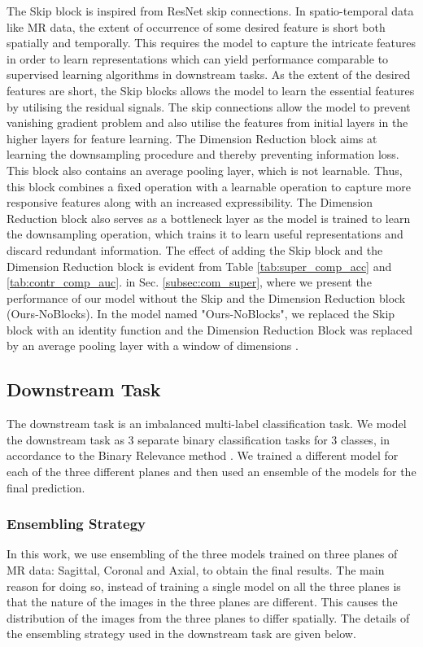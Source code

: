 \documentclass[journal]{IEEEtai}
\begin{document}
\indent The Skip block is inspired from ResNet \cite{resnet} skip connections. In spatio-temporal data like MR data, the extent of occurrence of some desired feature is short both spatially and temporally. This requires the model to capture the intricate features in order to learn representations which can yield performance comparable to supervised learning algorithms in downstream tasks. As the extent of the desired features are short, the Skip blocks allows the model to learn the essential features by utilising the residual signals. The skip connections allow the model to prevent vanishing gradient problem and also utilise the features from initial layers in the higher layers for feature learning. The Dimension Reduction block aims at learning the downsampling procedure and thereby preventing information loss. This block also contains an average pooling layer, which is not learnable. Thus, this block combines a fixed operation with a learnable operation to capture more responsive features along with an increased expressibility. The Dimension Reduction block also serves as a bottleneck layer as the model is trained to learn the downsampling operation, which trains it to learn useful representations and discard redundant information. The effect of adding the Skip block and the Dimension Reduction block is evident from Table \ref{tab:super_comp_acc} and \ref{tab:contr_comp_auc}. in Sec. \ref{subsec:com_super}, where we present the performance of our model without the Skip and the Dimension Reduction block (Ours-NoBlocks). In the model named "Ours-NoBlocks", we replaced the Skip block with an identity function  and the Dimension Reduction Block was replaced by an average pooling layer with a window of dimensions .

\subsection{Downstream Task}
\label{subsec:downstream}
\indent The downstream task is an imbalanced multi-label classification task. We model the downstream task as 3 separate binary classification tasks for 3 classes, in accordance to the Binary Relevance method \cite{Godbole2004DiscriminativeMF}. We trained a different model for each of the three different planes and then used an ensemble of the models for the final prediction. 

\subsubsection{Ensembling Strategy}
\label{subsubsec:downstream_ensembling}
In this work, we use ensembling of the three models trained on three planes of MR data: Sagittal, Coronal and Axial, to obtain the final results. The main reason for doing so, instead of training a single model on all the three planes is that the nature of the images in the three planes are different. This causes the distribution of the images from the three planes to differ spatially. The details of the ensembling strategy used in the downstream task are given below.
\end{document}

